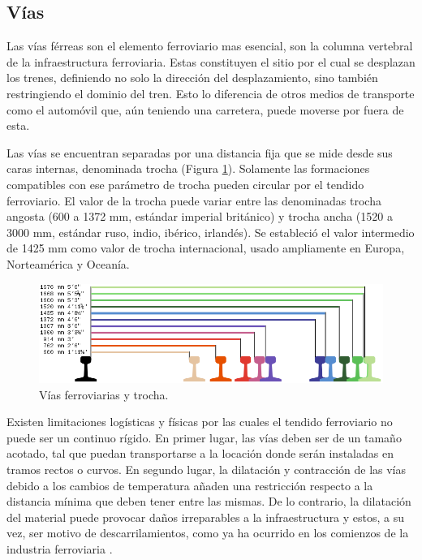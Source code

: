 \subsection{Vías}
	\label{sec:tracks}
	
    Las vías férreas son el elemento ferroviario mas esencial, son la columna vertebral de la infraestructura ferroviaria. Estas constituyen el sitio por el cual se desplazan los trenes, definiendo no solo la dirección del desplazamiento, sino también restringiendo el dominio del tren. Esto lo diferencia de otros medios de transporte como el automóvil que, aún teniendo una carretera, puede moverse por fuera de esta.

    Las vías se encuentran separadas por una distancia fija que se mide desde sus caras internas, denominada trocha (Figura \ref{fig:vias_1}). Solamente las formaciones compatibles con ese parámetro de trocha pueden circular por el tendido ferroviario. El valor de la trocha puede variar entre las denominadas trocha angosta (600 a 1372 mm, estándar imperial británico) y trocha ancha (1520 a 3000 mm, estándar ruso, indio, ibérico, irlandés). Se estableció el valor intermedio de 1425 mm como valor de trocha internacional, usado ampliamente en Europa, Norteamérica y Oceanía.

    \begin{figure}[!h]
        \centering
        \includegraphics[width=1\textwidth]{Figuras/trocha.png}
        \centering\caption{Vías ferroviarias y trocha.}
        \label{fig:vias_1}
    \end{figure}
    
    Existen limitaciones logísticas y físicas por las cuales el tendido ferroviario no puede ser un continuo rígido. En primer lugar, las vías deben ser de un tamaño acotado, tal que puedan transportarse a la locación donde serán instaladas en tramos rectos o curvos. En segundo lugar, la dilatación y contracción de las vías debido a los cambios de temperatura añaden una restricción respecto a la distancia mínima que deben tener entre las mismas. De lo contrario, la dilatación del material puede provocar daños irreparables a la infraestructura y estos, a su vez, ser motivo de descarrilamientos, como ya ha ocurrido en los comienzos de la industria ferroviaria \cite{ACCIDENTE}. 
    
